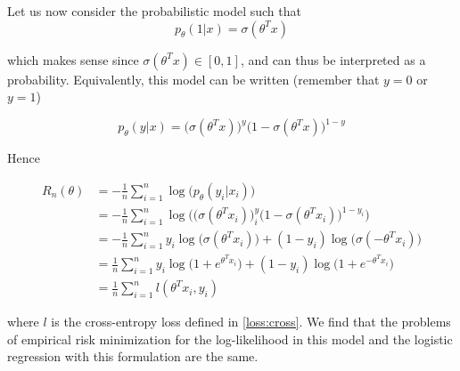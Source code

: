 \documentclass[
10pt, %
a4paper, %
oneside, %
headinclude,footinclude, %
BCOR5mm, %
]{scrartcl}
\begin{document}
Let us now consider the probabilistic model such that
\begin{equation*}
    p_{\theta}(1|x) = \sigma(\theta^Tx)
\end{equation*}

which makes sense since $\sigma(\theta^Tx)\in [0, 1]$, and can thus be interpreted as a probability. Equivalently, this model can be written (remember that $y=0$ or $y=1$)

\begin{equation*}
    p_{\theta}(y|x) = \big(\sigma(\theta^Tx)\big)^y\big(1-\sigma(\theta^Tx) \big)^{1-y}
\end{equation*}

Hence 

\begin{equation*}
    \begin{aligned}
	R_n(\theta) &= - \frac{1}{n} \sum^{n}_{i=1} \log\big(p_{\theta}(y_i|x_i)\big)\\
	&=- \frac{1}{n} \sum^{n}_{i=1} \log\Big(\big(\sigma(\theta^Tx_i)\big)^y_i\big(1-\sigma(\theta^Tx_i) \big)^{1-y_i}\Big)\\
	&=- \frac{1}{n} \sum^{n}_{i=1} y_i\log\Big(\sigma(\theta^Tx_i)\Big)+ (1-y_i)\log\Big(\sigma(-\theta^Tx_i)\Big)\\
	&=\frac{1}{n} \sum^{n}_{i=1} y_i\log\Big(1+e^{\theta^Tx_i}\Big)+ (1-y_i)\log\Big(1+e^{-\theta^Tx_i}\Big)\\
	&=\frac{1}{n} \sum^{n}_{i=1} l(\theta^Tx_i,y_i)
    \end{aligned}
\end{equation*}

where $l$ is the cross-entropy loss defined in \ref{loss:cross}. We find that the problems of empirical risk minimization for the log-likelihood in this model and the logistic regression with this formulation are the same.


 
\end{document}

